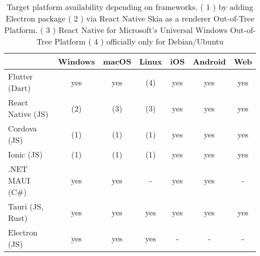 \begin{table}[H]
    \centering
    \begin{tabular}{lcccccc}
      \toprule
                        & Windows &  macOS  & Linux &  iOS  & Android &  Web  \\
      \midrule
      Flutter (Dart)    &   yes   &   yes   &  (4)  &  yes  &   yes   &  yes  \\
      React Native (JS) &   (2)   &   (3)   &  (3)  &  yes  &   yes   &  yes  \\
      Cordova (JS)      &   (1)   &   (1)   &  (1)  &  yes  &   yes   &  yes  \\
      Ionic (JS)        &   (1)   &   (1)   &  (1)  &  yes  &   yes   &  yes  \\
      .NET MAUI (C\#)   &   yes   &   yes   &   -   &  yes  &   yes   &   -   \\
      Tauri (JS, Rust)  &   yes   &   yes   &  yes  &  yes  &   yes   &  yes  \\
      Electron (JS)     &   yes   &   yes   &  yes  &  -    &    -    &  -    \\
      \bottomrule
    \end{tabular}
    \caption[Platform availability]{\label{tab:example}Target platform availability depending on frameworks.
    \newline ( 1 ) by adding Electron package
    \newline ( 2 ) via React Native Skia as a renderer Out-of-Tree Platform.
    \newline ( 3 ) React Native for Microsoft's Universal Windows Out-of-Tree Platform
    \newline ( 4 ) officially only for Debian/Ubuntu
    }
  
\end{table}